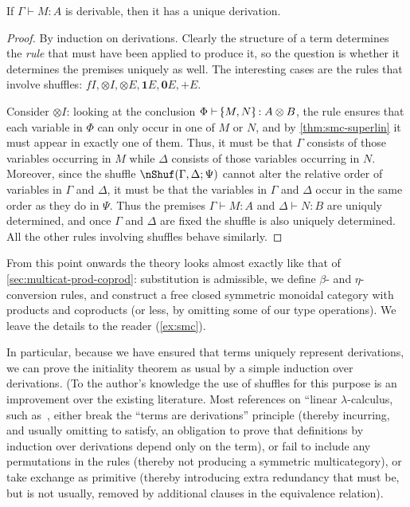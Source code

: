 \documentclass{book}
\let\types\vdash
\def\plusE{\mathord{+}E}
\def\zero{\mathbf{0}}
\def\one{\mathbf{1}}
\let\tensor\otimes
\def\tensorI{\mathord{\tensor}I}
\def\tensorE{\mathord{\tensor}E}
\def\tpair#1#2{\text{\textlquill} #1,#2 \text{\textrquill}}%
\begin{document}
\begin{lem}\label{thm:smc-tad}
  If $\Gamma\types M:A$ is derivable, then it has a unique derivation.
\end{lem}
\begin{proof}
  By induction on derivations.
  Clearly the structure of a term determines the \emph{rule} that must have been applied to produce it, so the question is whether it determines the premises uniquely as well.
  The interesting cases are the rules that involve shuffles: $fI,\tensorI,\tensorE,\one E,\zero E,\plusE$.

  Consider $\tensorI$: looking at the conclusion $\Phi \types \tpair M N : A \tensor B$, the rule ensures that each variable in $\Phi$ can only occur in one of $M$ or $N$, and by \cref{thm:smc-superlin} it must appear in exactly one of them.
  Thus, it must be that $\Gamma$ consists of those variables occurring in $M$ while $\Delta$ consists of those variables occurring in $N$.
  Moreover, since the shuffle $\nShuf(\Gamma,\Delta;\Psi)$ cannot alter the relative order of variables in $\Gamma$ and $\Delta$, it must be that the variables in $\Gamma$ and $\Delta$ occur in the same order as they do in $\Psi$.
  Thus the premises $\Gamma\types M:A$ and $\Delta\types N:B$ are uniquly determined, and once $\Gamma$ and $\Delta$ are fixed the shuffle is also uniquely determined.
  All the other rules involving shuffles behave similarly.
\end{proof}

From this point onwards the theory looks almost exactly like that of \cref{sec:multicat-prod-coprod}: substitution is admissible, we define $\beta$- and $\eta$-conversion rules, and construct a free closed symmetric monoidal category with products and coproducts (or less, by omitting some of our type operations).
We leave the details to the reader (\cref{ex:smc}).

In particular, because we have ensured that terms uniquely represent derivations, we can prove the initiality theorem as usual by a simple induction over derivations.
(To the author's knowledge the use of shuffles for this purpose is an improvement over the existing literature.
Most references on ``linear $\lambda$-calculus, such as~\cite{bbdph:linear-lambdacalc}, either break the ``terms are derivations'' principle (thereby incurring, and usually omitting to satisfy, an obligation to prove that definitions by induction over derivations depend only on the term), or fail to include any permutations in the rules (thereby not producing a symmetric multicategory), or take exchange as primitive (thereby introducing extra redundancy that must be, but is not usually, removed by additional clauses in the equivalence relation).
\end{document}
